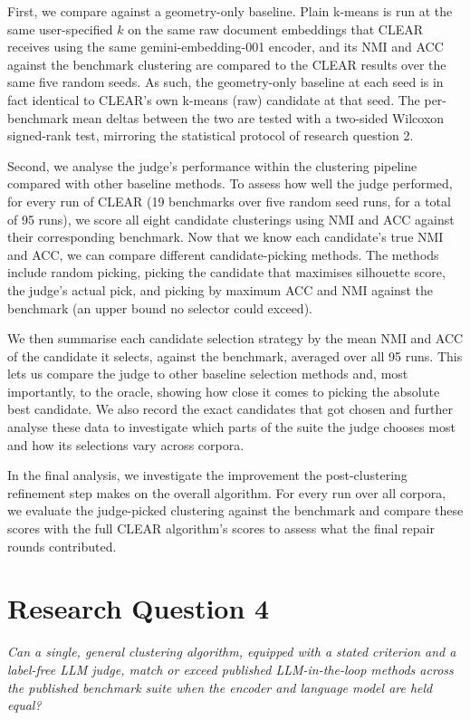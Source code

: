 \documentclass[11pt,a4paper,oneside]{report}
\begin{document}
First, we compare against a geometry-only baseline. Plain k-means is run at the same user-specified $k$ on the same raw document embeddings that CLEAR receives using the same {\small\ttfamily gemini-embedding-001} encoder, and its NMI and ACC against the benchmark clustering are compared to the CLEAR results over the same five random seeds. As such, the geometry-only baseline at each seed is in fact identical to CLEAR's own k-means (raw) candidate at that seed. The per-benchmark mean deltas between the two are tested with a two-sided Wilcoxon signed-rank test, mirroring the statistical protocol of research question 2.

Second, we analyse the judge's performance within the clustering pipeline compared with other baseline methods. To assess how well the judge performed, for every run of CLEAR (19 benchmarks over five random seed runs, for a total of 95 runs), we score all eight candidate clusterings using NMI and ACC against their corresponding benchmark. Now that we know each candidate's true NMI and ACC, we can compare different candidate-picking methods. The methods include random picking, picking the candidate that maximises silhouette score, the judge's actual pick, and picking by maximum ACC and NMI against the benchmark (an upper bound no selector could exceed).

We then summarise each candidate selection strategy by the mean NMI and ACC of the candidate it selects, against the benchmark, averaged over all 95 runs. This lets us compare the judge to other baseline selection methods and, most importantly, to the oracle, showing how close it comes to picking the absolute best candidate. We also record the exact candidates that got chosen and further analyse these data to investigate which parts of the suite the judge chooses most and how its selections vary across corpora.

In the final analysis, we investigate the improvement the post-clustering refinement step makes on the overall algorithm. For every run over all corpora, we evaluate the judge-picked clustering against the benchmark and compare these scores with the full CLEAR algorithm's scores to assess what the final repair rounds contributed.

\section{Research Question 4}

\emph{Can a single, general clustering algorithm, equipped with a stated criterion and a label-free LLM judge, match or exceed published LLM-in-the-loop methods across the published benchmark suite when the encoder and language model are held equal?}\\
\end{document}
